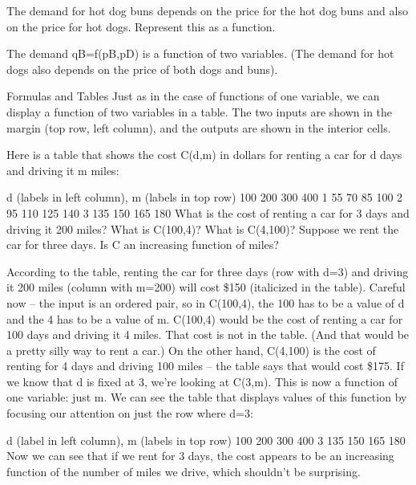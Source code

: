 \begin{example}
The demand for hot dog buns depends on the price for the hot dog buns and also on the price for hot dogs. Represent this as a function.

\begin{solution} The demand qB=f(pB,pD) is a function of two variables. (The demand for hot dogs also depends on the price of both dogs and buns).
\end{solution}\end{example}

Formulas and Tables
Just as in the case of functions of one variable, we can display a function of two variables in a table. The two inputs are shown in the margin (top row, left column), and the outputs are shown in the interior cells.

\begin{example}
Here is a table that shows the cost C(d,m) in dollars for renting a car for d days and driving it m miles:

d (labels in left column), m (labels in top row)	100	200	300	400	1	55	70	85	100	2	95	110	125	140	3	135	150	165	180
What is the cost of renting a car for 3 days and driving it 200 miles?
What is C(100,4)? What is C(4,100)?
Suppose we rent the car for three days. Is C an increasing function of miles?

\begin{solution} According to the table, renting the car for three days (row with d=3) and driving it 200 miles (column with m=200) will cost \$150 (italicized in the table).
Careful now – the input is an ordered pair, so in C(100,4), the 100 has to be a value of d and the 4 has to be a value of m. C(100,4) would be the cost of renting a car for 100 days and driving it 4 miles. That cost is not in the table. (And that would be a pretty silly way to rent a car.) On the other hand, C(4,100) is the cost of renting for 4 days and driving 100 miles – the table says that would cost \$175.
If we know that d is fixed at 3, we're looking at C(3,m). This is now a function of one variable: just m. We can see the table that displays values of this function by focusing our attention on just the row where d=3:

d (label in left column), m (labels in top row)	100	200	300	400	3	135	150	165	180
Now we can see that if we rent for 3 days, the cost appears to be an increasing function of the number of miles we drive, which shouldn't be surprising.
\end{solution}\end{example}

